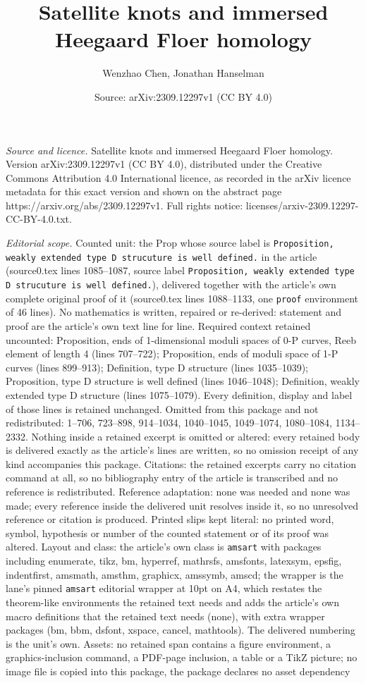 \documentclass[10pt,a4paper]{amsart}
\title[Satellite knots and immersed Heegaard Floer homology]{Satellite knots and immersed Heegaard Floer homology}
\author{Wenzhao Chen, Jonathan Hanselman}
\date{Source: arXiv:2309.12297v1 (CC BY 4.0)}
\begin{document}
\maketitle

\noindent\emph{Source and licence.} Satellite knots and immersed Heegaard Floer homology. Version arXiv:2309.12297v1 (CC BY 4.0), distributed under the Creative Commons Attribution 4.0 International licence, as recorded in the arXiv licence metadata for this exact version and shown on the abstract page https://arxiv.org/abs/2309.12297v1. Full rights notice: licenses/arxiv-2309.12297-CC-BY-4.0.txt.\par\smallskip

\noindent\textit{Editorial scope.} Counted unit: the Prop whose source label is \texttt{Proposition, weakly extended type D strucuture is well defined.} in the article (source0.tex lines 1085--1087, source label \texttt{Proposition, weakly extended type D strucuture is well defined.}), delivered together with the article's own complete original proof of it (source0.tex lines 1088--1133, one \texttt{proof} environment of 46 lines). No mathematics is written, repaired or re-derived: statement and proof are the article's own text line for line. Required context retained uncounted: Proposition, ends of 1-dimensional moduli spaces of 0-P curves, Reeb element of length 4 (lines 707--722); Proposition, ends of moduli space of 1-P curves (lines 899--913); Definition, type D structure (lines 1035--1039); Proposition, type D structure is well defined (lines 1046--1048); Definition, weakly extended type D structure (lines 1075--1079). Every definition, display and label of those lines is retained unchanged. Omitted from this package and not redistributed: 1--706, 723--898, 914--1034, 1040--1045, 1049--1074, 1080--1084, 1134--2332. Nothing inside a retained excerpt is omitted or altered: every retained body is delivered exactly as the article's lines are written, so no omission receipt of any kind accompanies this package. Citations: the retained excerpts carry no citation command at all, so no bibliography entry of the article is transcribed and no reference is redistributed. Reference adaptation: none was needed and none was made; every reference inside the delivered unit resolves inside it, so no unresolved reference or citation is produced. Printed slips kept literal: no printed word, symbol, hypothesis or number of the counted statement or of its proof was altered. Layout and class: the article's own class is \texttt{amsart} with packages including enumerate, tikz, bm, hyperref, mathrsfs, amsfonts, latexsym, epsfig, indentfirst, amsmath, amsthm, graphicx, amssymb, amscd; the wrapper is the lane's pinned \texttt{amsart} editorial wrapper at 10pt on A4, which restates the theorem-like environments the retained text needs and adds the article's own macro definitions that the retained text needs (none), with extra wrapper packages (bm, bbm, dsfont, xspace, cancel, mathtools). The delivered numbering is the unit's own. Assets: no retained span contains a figure environment, a graphics-inclusion command, a PDF-page inclusion, a table or a TikZ picture; no image file is copied into this package, the package declares no asset dependency 
\end{document}
